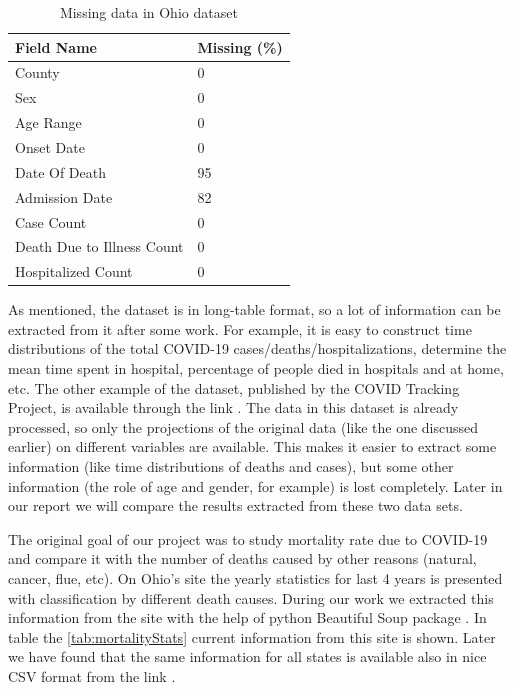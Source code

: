 \documentclass[conference]{IEEEtran}
\begin{document}
\begin{table}
  \centering
  \begin{tabular}{ll}
    \toprule
    Field Name & Missing (\%) \\
    \midrule
    County & 0  \\
    Sex & 0  \\
    Age Range & 0  \\
               Onset Date & 0  \\
               Date Of Death & 95 \\
               Admission Date &  82 \\
               Case Count & 0  \\
               Death Due to Illness Count & 0 \\
               Hospitalized Count & 0  \\
    \bottomrule
  \end{tabular}
  \caption{Missing data in Ohio dataset}
  \label{tab:Ohio:missing}
\end{table}

As mentioned, the dataset is in long-table format, so a lot of information can be extracted from it after some work. For example, it is easy to construct time distributions of the total COVID-19 cases/deaths/hospitalizations, determine the mean time spent in hospital, percentage of people died in hospitals and at home, etc. The other example of the dataset, published by the COVID Tracking Project, is available through the link \cite{covid19tracking_covid_nodate}. The data in this dataset is already processed, so only the projections of the original data (like the one discussed earlier) on different variables are available. This makes it easier to extract some information (like time distributions of deaths and cases), but some other information (the role of age and gender, for example) is lost completely. Later in our report we will compare the results extracted from these two data sets.

The original goal of our project was to study mortality rate due to COVID-19 and compare it with the number of deaths caused by other reasons (natural, cancer, flue, etc). On Ohio's site \cite{statistics_stats_nodate} the yearly statistics for last 4 years is presented with classification by different death causes. During our work we extracted this information from the site with the help of python Beautiful Soup package \cite{team_beautiful_nodate}. In table the \ref{tab:mortalityStats} current information from this site is shown. Later we have found that the same information for all states is available also in nice CSV format from the link \cite{cdc_weekly_nodate}. 
\end{document}
